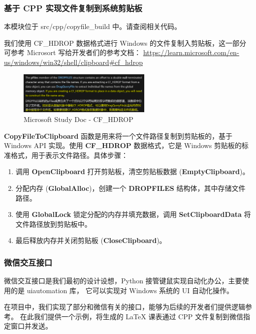 \documentclass[14pt,a4paper,UTF8,twoside]{article}
\renewcommand{\texttt}[1]{{\color{blue}\ttfamily#1}}
\begin{document}
\subsubsection{基于 CPP 实现文件复制到系统剪贴板}

\begin{note}
本模块位于 \texttt{src/cpp/copyfile\_build} 中。请查阅相关代码。

我们使用 \texttt{CF\_HDROP} 数据格式进行 Windows 的文件复制入剪贴板，这一部分可参考 Microsort 写给开发者们的参考文档：
\href{https://learn.microsoft.com/en-us/windows/win32/shell/clipboard#cf_hdrop}{\underline{https://learn.microsoft.com/en-us/windows/win32/shell/clipboard\#cf\_hdrop}}
\end{note}

\begin{figure}[H]
    \centering
    \includegraphics[width=0.578\textwidth]{img/CF_HDROP.png}
    \caption{Microsoft Study Doc - CF\_HDROP}
    \label{fig:copyfile_to_clipboard}
\end{figure}

\textbf{CopyFileToClipboard} 函数是用来将一个文件路径复制到剪贴板的，基于 Windows API 实现。使用 \textbf{CF\_HDROP} 数据格式，它是 Windows 剪贴板的标准格式，用于表示文件路径。具体步骤：

\begin{enumerate}
    \item 调用 \textbf{OpenClipboard} 打开剪贴板，清空剪贴板数据 (\textbf{EmptyClipboard})。
    \item 分配内存 (\textbf{GlobalAlloc})，创建一个 \textbf{DROPFILES} 结构体，其中存储文件路径。
    \item 使用 \textbf{GlobalLock} 锁定分配的内存并填充数据，调用 \textbf{SetClipboardData} 将文件路径放到剪贴板中。
    \item 最后释放内存并关闭剪贴板 (\textbf{CloseClipboard})。
\end{enumerate}

\subsubsection{微信交互接口}

\begin{note}
微信交互接口是我们最初的设计设想，Python 接管键鼠实现自动化办公，主要使用的是 uiautomation 库，
它可以实现对 Windows 系统的 UI 自动化操作。

\vspace{0.3cm}

在项目中，我们实现了部分和微信有关的接口，能够为后续的开发者们提供逻辑参考。
在此我们提供一个示例，将生成的 LaTeX 课表通过 CPP 文件复制到微信指定窗口并发送。
\end{note}
\end{document}
